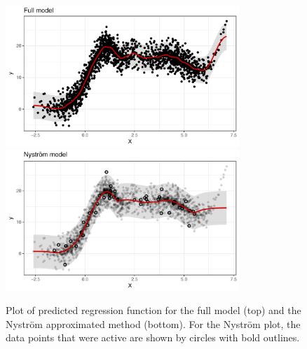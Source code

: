 \documentclass[showframe,11pt,twoside,openright]{report}\usepackage[]{graphicx}\usepackage{xcolor}
\makeatletter
\newenvironment{kframe}{%
 \def\at@end@of@kframe{}%
 \ifinner\ifhmode%
  \def\at@end@of@kframe{\end{minipage}}%
  \begin{minipage}{\columnwidth}%
 \fi\fi%
 \def\FrameCommand##1{\hskip\@totalleftmargin \hskip-\fboxsep
 \colorbox{shadecolor}{##1}\hskip-\fboxsep
     \hskip-\linewidth \hskip-\@totalleftmargin \hskip\columnwidth}%
 \MakeFramed {\advance\hsize-\width
   \@totalleftmargin\z@ \linewidth\hsize
   \@setminipage}}%
 {\par\unskip\endMakeFramed%
 \at@end@of@kframe}
\newenvironment{knitrout}{}{} %
\makeatother
\begin{document}
\begin{knitrout}
\color{fgcolor}\begin{kframe}
\singlespacing\end{kframe}\begin{figure}[htbp]

{\centering \includegraphics[width=0.785\textwidth]{figure/04-nystrom_plot-1} 
\includegraphics[width=0.785\textwidth]{figure/04-nystrom_plot-2} 

}

\caption[Plot of predicted regression function for the Nystr"om example]{Plot of predicted regression function for the full model (top) and the Nystr\"om approximated method (bottom). For the Nystr\"om plot, the data points that were active are shown by circles with bold outlines.}\label{fig:nystrom.plot}
\end{figure}


\end{knitrout}
\end{document}
